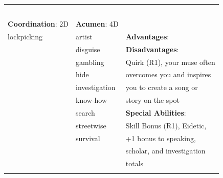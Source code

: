 \documentclass[10pt]{article}
\begin{document}
\begin{table}
\begin{tabular}{m{156pt} m{156pt} m{156pt}}
 \hrulefill &  \hrulefill & \\

 \hrulefill &  \hrulefill & \\

 \hrulefill &  \hrulefill & \\

 \hrulefill &  \hrulefill & \\

 \hrulefill &  \hrulefill & \\


\textbf{Coordination}: 2D \hrulefill & \textbf{Acumen}: 4D \hrulefill     & \hrulefill \\

lockpicking          \hrulefill & artist               \hrulefill & \textbf{Advantages}: \hrulefill \\

 \hrulefill & disguise             \hrulefill & \textbf{Disadvantages}: \hrulefill \\

 \hrulefill & gambling             \hrulefill & Quirk (R1), your muse often \hrulefill \\

 \hrulefill & hide                 \hrulefill & overcomes you and inspires \hrulefill \\

 \hrulefill & investigation        \hrulefill & you to create a song or \hrulefill \\

 \hrulefill & know-how             \hrulefill & story on the spot \hrulefill \\

 \hrulefill & search               \hrulefill & \textbf{Special Abilities}: \hrulefill \\

 \hrulefill & streetwise           \hrulefill & Skill Bonus (R1), Eidetic, \hrulefill \\

 \hrulefill & survival             \hrulefill & +1 bonus to speaking, \hrulefill \\

 \hrulefill &  \hrulefill & scholar, and investigation \hrulefill \\

 \hrulefill &  \hrulefill & totals \hrulefill \\

 \hrulefill &  \hrulefill &  \hrulefill \\


\end{tabular}
\end{table}
\end{document}
